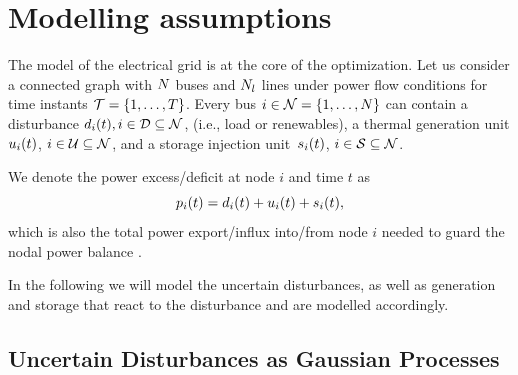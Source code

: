 \documentclass[final,3p,times,twocolumn]{elsarticle}  %
\begin{document}
\section{Modelling assumptions}
\label{sec:modelling_all}

The model of the electrical grid is at the core of the optimization. 
Let us consider a connected graph with $N$ buses and $N_l$ lines 
under \dc power flow conditions 
for time instants $\mathcal{T} = \{ 1, \dots, T \}$.
Every bus $i \in \mathcal{N} =  \{1, \dots, N \}$ can contain a disturbance $\load_i(t), i\in\mathcal{\Load}\subseteq\mathcal{\nbus}$, (i.e., load or renewables), a thermal generation unit $u_i(t)$, $i\in\mathcal{\Gen}\subseteq\mathcal{\nbus}$, and a storage injection unit~$s_i(t)$, $i\in\mathcal{\Storage}\subseteq\mathcal{\nbus}$.

We denote the power excess/deficit at node $i$ and time $t$ as
\begin{equation}
    p_i(t) = d_i(t) + u_i(t) + s_i(t),
\end{equation}
which is also the total power export/influx into/from node $i$ needed to guard the nodal power balance \cite{horsch_linear_2017}. 

In the following we will model the uncertain disturbances, as well as generation and storage that react to the disturbance and are modelled accordingly.

\subsection{Uncertain Disturbances as Gaussian Processes}
\label{sec:GP}
\end{document}
